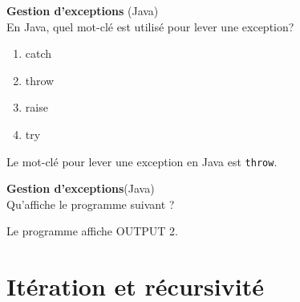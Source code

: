 \begin{Exercice}[5 minutes]\textbf{Gestion d'exceptions} (Java)\\

    En Java, quel mot-clé est utilisé pour lever une exception?

    \begin{enumerate}
        \item catch
        \item throw
        \item raise 
        \item try
    \end{enumerate}
    
    \begin{solution}   
    Le mot-clé pour lever une exception en Java est \lstinline{throw}.
        
    \end{solution}
        
 \end{Exercice}

 \begin{Exercice}[5 minutes]\textbf{Gestion d'exceptions}(Java)\\

    Qu'affiche le programme suivant ?
    

    
        
        \begin{solution}   
        Le programme affiche OUTPUT 2.             
        \end{solution}
        
 \end{Exercice}



    



\section{Itération et récursivité}

